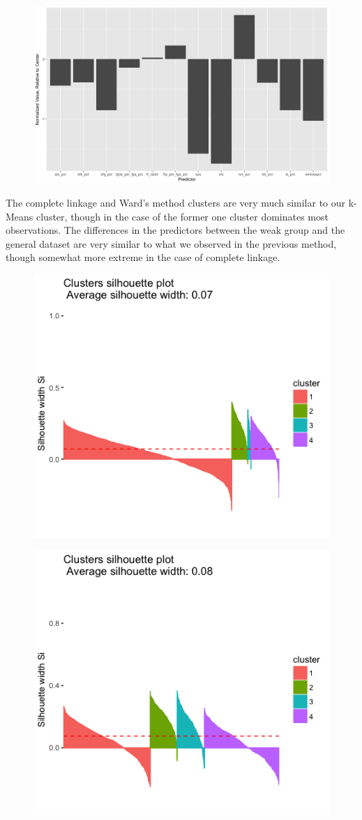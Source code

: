 \documentclass[10pt,a4paper, hidelinks]{article} %
\begin{document}
\begin{figure}[H]
	\centering
	\includegraphics[width=0.7\linewidth]{"../fig/wardweak"}
\end{figure}


The complete linkage and Ward's method clusters are very much similar to our k-Means cluster, though in the case of the former one cluster dominates most observations.  The differences in the predictors between the weak group and the general dataset are very similar to what we observed in the previous method, though somewhat more extreme in the case of complete linkage.

\begin{figure}[H]
	\centering
	\includegraphics[width=0.7\linewidth]{"../fig/compsil"}
\end{figure}

\begin{figure}[H]
	\centering
	\includegraphics[width=0.7\linewidth]{"../fig/wardsil"}
\end{figure}
\end{document}
